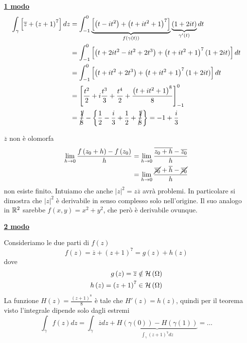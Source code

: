 \textbf{\underline{1 modo}}
\begin{align*}
\int\nolimits _{\gamma }\left[\overline{z} + \left(z + 1\right)^{7}\right] dz & = \int\nolimits ^{0}_{ - 1}\underbrace{\left[\left(t - it^{2}\right) + \left(t + it^{2} + 1\right)^{7}\right]}_{f\left(\gamma \left(t\right)\right)}\underbrace{\left(1 + 2it\right)}_{\gamma '\left(t\right)} dt\\
 & = \int\nolimits ^{0}_{ - 1}\left[\left(t + 2it^{2} - it^{2} + 2t^{3}\right) + \left(t + it^{2} + 1\right)^{7}\left(1 + 2it\right)\right] dt\\
 & = \int\nolimits ^{0}_{ - 1}\left[\left(t + it^{2} + 2t^{3}\right) + \left(t + it^{2} + 1\right)^{7}\left(1 + 2it\right)\right] dt\\
 & = \left[\frac{t^{2}}{2} + i\frac{t^{3}}{3} + \frac{t^{4}}{2} + \frac{\left(t + it^{2} + 1\right)^{8}}{8}\right]^{0}_{ - 1}\\
 & = \cancel{\frac{1}{8}} - \left\{\frac{1}{2} - \frac{i}{3} + \frac{1}{2} + \cancel{\frac{1}{8}}\right\} = - 1 + \frac{i}{3}
\end{align*}
\begin{rem}
$\overline{z}$ non è olomorfa
\begin{align*}
\lim\limits _{h\rightarrow 0}\frac{f\left(z_{0} + h\right) - f\left(z_{0}\right)}{h} & = \lim\limits _{h\rightarrow 0}\frac{\overline{z_{0} + h} - \overline{z_{0}}}{h}\\
 & = \lim\limits _{h\rightarrow 0}\frac{\cancel{\overline{z_{0}}} + \overline{h} - \cancel{\overline{z_{0}}}}{h}
\end{align*}
non esiste finito. Intuiamo che anche $\left| z\right| ^{2} = z\overline{z}$ avrà problemi. In particolare si dimostra che $\left| z\right| ^{2}$ è derivabile in senso complesso solo nell'origine. Il suo analogo in $\mathbb{R} ^{2}$ sarebbe $f\left(x,y\right) = x^{2} + y^{2}$, che però è derivabile ovunque.
\end{rem}
\textbf{\underline{2 modo}}

Consideriamo le due parti di $f\left(z\right)$
\begin{equation*}
f\left(z\right) = \overline{z} + \left(z + 1\right)^{7} = g\left(z\right) + h\left(z\right)
\end{equation*}
dove
\begin{equation*}
\begin{aligned}
g\left(z\right) = \overline{z} & \notin \mathcal{H} \left(\Omega \right)\\
h\left(z\right) = \left(z + 1\right)^{7} & \in \mathcal{H} \left(\Omega \right)
\end{aligned}
\end{equation*}
La funzione $H\left(z\right) = \frac{\left(z + 1\right)^{8}}{8}$ è tale che $H'\left(z\right) = h\left(z\right)$, quindi per il teorema visto l'integrale dipende solo dagli estremi
\begin{equation*}
\int\nolimits _{\gamma } f\left(z\right) dz = \int\nolimits _{\gamma }\overline{z} dz + \underbrace{H\left(\gamma \left(0\right)\right) - H\left(\gamma \left(1\right)\right)}_{\int\nolimits _{\gamma }\left(z + 1\right)^{7} dz} = \dotsc 
\end{equation*}
\Soluzione

